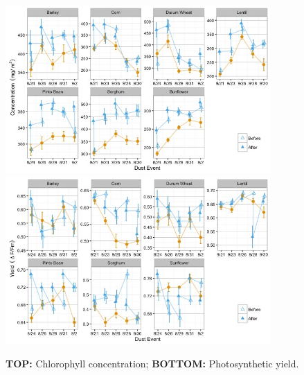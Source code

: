 \documentclass[]{scrartcl}
\begin{document}
\begin{figure}[!h]
  \centering
  \includegraphics[width=0.9\textwidth]{figures/chlorconc.jpg}\\
  \includegraphics[width=0.9\textwidth]{figures/photoact.jpg}\\
  \caption{\textbf{TOP:} Chlorophyll concentration; \textbf{BOTTOM:} Photosynthetic yield. }
\end{figure}

\clearpage
\end{document}
